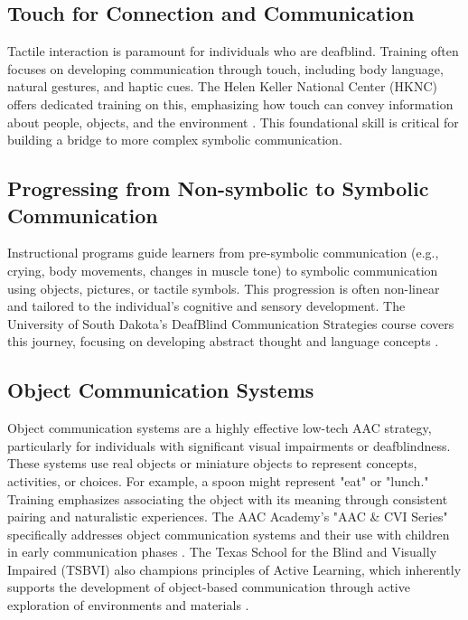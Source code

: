 \subsection{Touch for Connection and Communication}\label{subsec:touch-connection}

Tactile interaction is paramount for individuals who are deafblind. Training often focuses on developing communication through touch, including body language, natural gestures, and haptic cues. The Helen Keller National Center (HKNC) offers dedicated training on this, emphasizing how touch can convey information about people, objects, and the environment  \cite{HKNC_Haptics}. This foundational skill is critical for building a bridge to more complex symbolic communication.

\subsection{Progressing from Non-symbolic to Symbolic Communication}\label{subsec:progress-symbolic}

Instructional programs guide learners from pre-symbolic communication (e.g., crying, body movements, changes in muscle tone) to symbolic communication using objects, pictures, or tactile symbols. This progression is often non-linear and tailored to the individual's cognitive and sensory development. The University of South Dakota's DeafBlind Communication Strategies course covers this journey, focusing on developing abstract thought and language concepts  \cite{USD}.

\subsection{Object Communication Systems}\label{subsec:object-comm}

Object communication systems are a highly effective low-tech AAC strategy, particularly for individuals with significant visual impairments or deafblindness. These systems use real objects or miniature objects to represent concepts, activities, or choices. For example, a spoon might represent "eat" or "lunch." Training emphasizes associating the object with its meaning through consistent pairing and naturalistic experiences. The AAC Academy's "AAC \& CVI Series" specifically addresses object communication systems and their use with children in early communication phases  \cite{AACA_CVI}. The Texas School for the Blind and Visually Impaired (TSBVI) also champions principles of Active Learning, which inherently supports the development of object-based communication through active exploration of environments and materials  \cite{TSBVI_ActiveLearning}.

